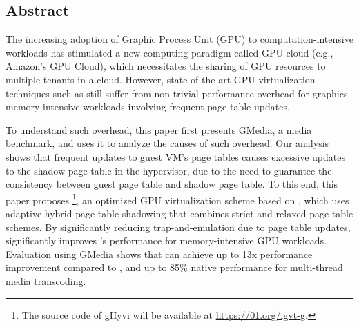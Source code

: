 \subsection*{Abstract}
\hspace{0pt}
The increasing adoption of Graphic Process Unit (GPU) to computation-intensive workloads
has stimulated a new computing paradigm called GPU cloud (e.g., Amazon's GPU Cloud), which
necessitates the sharing of GPU resources to multiple tenants in a cloud. 
However, state-of-the-art GPU virtualization techniques such as \gvirt{} still suffer 
from non-trivial performance overhead for graphics memory-intensive workloads 
involving frequent page table updates.

To understand such overhead, this paper first presents GMedia, a media benchmark, 
and uses it to analyze the causes of such overhead.  
Our analysis shows that frequent updates to guest VM's page tables causes 
excessive updates to the shadow page table in the hypervisor, due to the need 
to guarantee the consistency between guest page table and shadow page table. 
To this end, this paper proposes \name{}\footnote{The source code of gHyvi will be available at \url{https://01.org/igvt-g}.}, an optimized GPU virtualization scheme 
based on \gvirt{}, which uses adaptive hybrid page table shadowing that 
combines strict and relaxed page table schemes. 
By significantly reducing trap-and-emulation due to page table updates, \name{} significantly improves \gvirt{}'s performance for memory-intensive 
GPU workloads. Evaluation using GMedia shows that \name{} can achieve up to 13x performance 
improvement compared to \gvirt{}, and up to 85\% native performance for multi-thread media 
transcoding.

\iffalse

\hspace{0pt}
The Graphic Process Unit (GPU) has become an indispensable building block in current virtual execution environment. For instance, \gvirt{} is one of the cutting edge full GPU virtualization solutions on Xen Hypervisor. However, it updates the shadow page table instantly after the guest page table is modified, which could incur big performance degradation within the graphics memory intensive workloads, such as media transcoding.

This paper presents a detailed analysis on \textit{Massive Update Issue} using a media performance benchmark, and introduces \name{}, an optimized full GPU virtualization solution based on Xen hypervisor, with adaptive hybrid page table shadowing scheme. By combining strict and relaxed page table shadowing scheme, \name{} improves \gvirt{}'s performance for memory intensive GPU workloads with frequent page table modification by removing the constraints of trap-and-emulation. Experiments on the benchmark GMedia show that \name{} can achieve up to 13x performance improvement compared to \gvirt{}, and up to 85\% native performance for multi-thread media transcoding.

\fi
